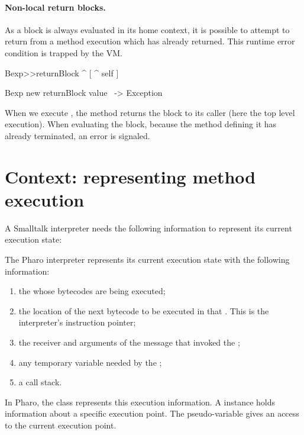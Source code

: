 \documentclass[a4paper,10pt,twoside]{book}
\begin{document}
\paragraph{Non-local return blocks.} As a block is always evaluated in its home context, it is possible to attempt to return from a method execution which has already returned. This runtime error condition is trapped by the VM.

\begin{code}{}
Bexp>>returnBlock
	^ [ ^ self ]

Bexp new returnBlock value ~-> Exception
\end{code}

When we execute , the method returns the block to its caller (here the top level execution). When evaluating the block, because the method defining it has already terminated, an error is signaled.


\section{Context: representing method execution}

A Smalltalk interpreter needs the following information to represent its current execution state:

The Pharo interpreter represents its current execution state with the following information:

\begin{enumerate}
\item the  whose bytecodes are being executed;
\item the location of the next bytecode to be executed in that
. This is the interpreter's instruction pointer;
\item the receiver and arguments of the message that invoked the
;
\item any temporary variable needed by the ;
\item a call stack.
\end{enumerate}

In Pharo, the class  represents this execution information. A  instance holds information about a specific execution point.  The pseudo-variable  gives an access to the current execution point.
\end{document}
